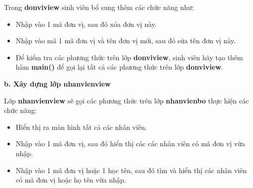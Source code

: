 Trong \textbf{donviview} sinh viên bổ sung thêm các chức năng như:
\begin{itemize}
	\item Nhập vào 1 mã đơn vị, sau đó xóa đơn vị này.
	\item Nhập vào mã 1 mã đơn vị và tên đơn vị mới, sau đó sửa tên đơn vị này.
	\item Để kiểm tra các phương thức trên lớp \textbf{donviview}, sinh viên hãy tạo thêm hàm \textbf{main()} để gọi lại tất cả các phương thức trên lớp \textbf{donviview}.\\
\end{itemize}
\textbf{ b. Xây dựng lớp nhanvienview}

 Lớp \textbf{nhanvienview}  sẽ gọi các phương thức trên lớp \textbf{nhanvienbo}  thực hiện các chức năng: 
\begin{itemize}
	\item Hiển thị ra màn hình tất cả các nhân viên.
	\item Nhập vào 1 mã đơn vị, sau đó hiển thị các các nhân viên có mã đơn vị vừa nhập.
	\item Nhập vào 1 mã đơn vị hoặc 1 học tên, sau đó tìm và hiển thị các nhân viên có mã đơn vị hoặc họ tên vừa nhập.
\end{itemize}
